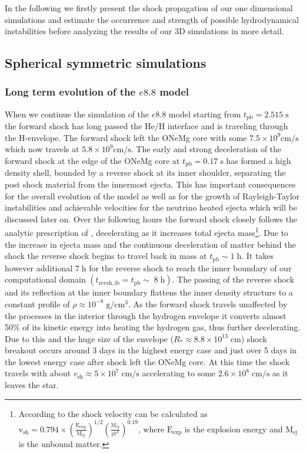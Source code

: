 \documentclass[fleqn,usenatbib]{mnras}
\begin{document}
In the following we firstly present the shock propagation of our one dimensional simulations and estimate the occurrence and strength of possible hydrodynamical instabilities before analyzing the results of our 3D simulations in more detail.

\subsection{Spherical symmetric simulations}
\subsubsection{Long term evolution of the $e8.8$ model}

When we continue the simulation of the $e8.8$ model starting from $t_{\mathrm{pb}}=2.515\;\mathrm{s}$ the forward shock has long passed the He/H interface and is traveling through the H-envelope. The forward shock left the ONeMg core with some $7.5\times 10^{9}\mathrm{cm/s}$ which now travels at $5.8\times 10^{9}\mathrm{cm/s}$. The early and strong deceleration of the forward shock at the edge of the ONeMg core at $t_{\mathrm{pb}}=0.17\;\mathrm{s}$ has formed a high density shell, bounded by a reverse shock at its inner shoulder, separating the post shock material from the innermost ejecta.  
This has important consequences for the overall evolution of the model as well as for the growth of Rayleigh-Taylor instabilities and achievable velocities for the neutrino heated ejecta which will be discussed later on.
Over the following hours the forward shock closely follows the analytic prescription of \citet{Matzner1998}, decelerating as it increases total ejecta mass\footnote{According to \citet{Matzner1998} the shock velocity can be calculated as $\mathrm{v_{sh}=0.794\times(\frac{E_{exp}}{M_{ej}})^{1/2}(\frac{M_{ej}}{\rho r^3})^{0.19}}$, where $\mathrm{E_{exp}}$ is the explosion energy and $\mathrm{M_{ej}}$ is the unbound matter.}. Due to the increase in ejecta mass and the continuous deceleration of matter behind the shock  the reverse shock begins to travel back in mass at  $t_{\mathrm{pb}}\sim 1\;\mathrm{h}$. It takes however additional $7\;\mathrm{h}$ for the reverse shock to reach the inner boundary of our computational domain $(t_{\mathrm{revsh,ib}}=t_{\mathrm{pb}}\sim \; 8\;\mathrm{h})$. The passing of the reverse shock and its reflection at the inner boundary flattens the inner density structure to a constant profile of $\rho\approx 10^{-8}\;\mathrm{g/cm^3}$.
As the forward shock travels unaffected by the processes in the interior through the hydrogen envelope it converts almost 50\% of its kinetic energy into heating the hydrogen gas, thus further decelerating. Due to this and the huge size of the envelope ($R_{*}\approx8.8\times10^{13}\;\mathrm{cm}$) shock breakout occurs around 3 days in the highest energy case and just over 5 days in the lowest energy case after shock left the ONeMg core. At this time the shock travels with about $v_{\mathrm{sh}}\approx 5\times 10^{7}\; \mathrm{cm/s}$ accelerating to some $2.6\times 10^{8}\; \mathrm{cm/s}$ as it leaves the star.
\end{document}
